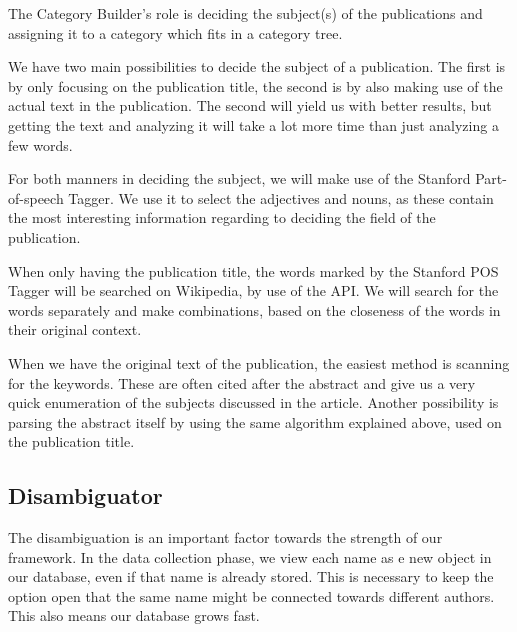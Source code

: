 
The Category Builder's role is deciding the subject(s) of the publications and assigning it to a category which fits in a category tree.


We have two main possibilities to decide the subject of a publication. The first is by only focusing on the publication title, the second is by also making use of the actual text in the publication. The second will yield us with better results, but getting the text and analyzing it will take a lot more time than just analyzing a few words. 

For both manners in deciding the subject, we will make use of the Stanford Part-of-speech Tagger. We use it to select the adjectives and nouns, as these contain the most interesting information regarding to deciding the field of the publication.

When only having the publication title, the words marked by the Stanford POS Tagger will be searched on Wikipedia, by use of the API. We will search for the words separately and make combinations, based on the closeness of the words in their original context.


When we have the original text of the publication, the easiest method is scanning for the keywords. These are often cited after the abstract and give us a very quick enumeration of the subjects discussed in the article. Another possibility is parsing the abstract itself by using the same algorithm explained above, used on the publication title.


\subsection{Disambiguator}
\label{disambiguator}

The disambiguation is an important factor towards the strength of our framework. In the data collection phase, we view each name as e new object in our database, even if that name is already stored. This is necessary to keep the option open that the same name might be connected towards different authors. This also means our database grows fast. 

